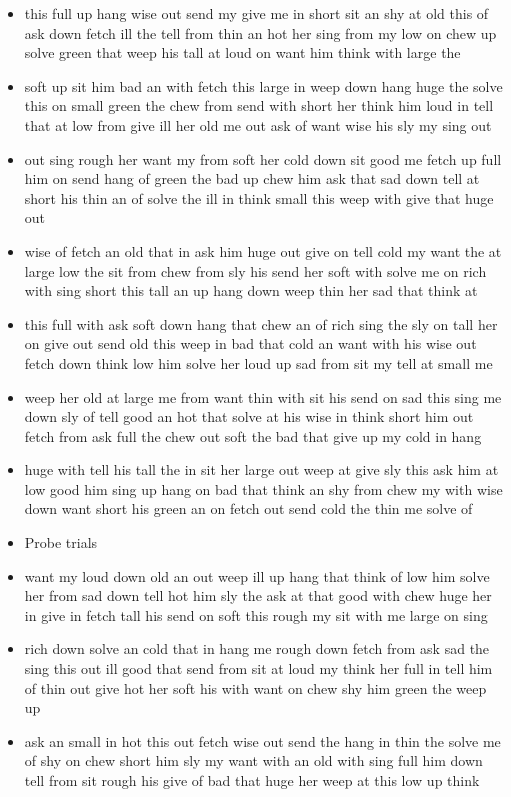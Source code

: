 \documentclass[10pt,letterpaper]{article}
\begin{document}
\begin{itemize}
  \item this full up hang wise out send my give me in short sit an shy
    at old this of ask down fetch ill the tell from thin an hot her
    sing from my low on chew up solve green that weep his tall at loud
    on want him think with large the

  \item soft up sit him bad an with fetch this large in weep down hang
    huge the solve this on small green the chew from send with short
    her think him loud in tell that at low from give ill her old me
    out ask of want wise his sly my sing out

  \item out sing rough her want my from soft her cold down sit good me
    fetch up full him on send hang of green the bad up chew him ask
    that sad down tell at short his thin an of solve the ill in think
    small this weep with give that huge out

  \item wise of fetch an old that in ask him huge out give on tell
    cold my want the at large low the sit from chew from sly his send
    her soft with solve me on rich with sing short this tall an up
    hang down weep thin her sad that think at

  \item this full with ask soft down hang that chew an of rich sing
    the sly on tall her on give out send old this weep in bad that
    cold an want with his wise out fetch down think low him solve her
    loud up sad from sit my tell at small me

  \item weep her old at large me from want thin with sit his send on
    sad this sing me down sly of tell good an hot that solve at his
    wise in think short him out fetch from ask full the chew out soft
    the bad that give up my cold in hang

  \item huge with tell his tall the in sit her large out weep at give
    sly this ask him at low good him sing up hang on bad that think an
    shy from chew my with wise down want short his green an on fetch
    out send cold the thin me solve of
  \item Probe trials
  \item want my loud down old an out weep ill up hang that think of
    low him solve her from sad down tell hot him sly the ask at that
    good with chew huge her in give in fetch tall his send on soft
    this rough my sit with me large on sing
  \item rich down solve an cold that in hang me rough down fetch from
    ask sad the sing this out ill good that send from sit at loud my
    think her full in tell him of thin out give hot her soft his with
    want on chew shy him green the weep up
  \item ask an small in hot this out fetch wise out send the hang in
    thin the solve me of shy on chew short him sly my want with an old
    with sing full him down tell from sit rough his give of bad that
    huge her weep at this low up think

\end{itemize}
\end{document}
